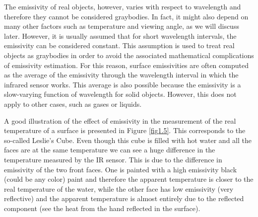 		\bigskip
		The emissivity of real objects, however, varies with respect to wavelength and therefore they cannot be considered graybodies. In fact, it might also depend on many other factors such as temperature and viewing angle, as we will discuss later. However, it is usually assumed that for short wavelength intervals, the emissivity can be considered constant. This assumption is used to treat real objects as graybodies in order to avoid the associated mathematical complications of emissivity estimation. For this reason, surface emissivities are often computed as the average of the emissivity through the wavelength interval in which the infrared sensor works. This average is also possible because the emissivity is a slow-varying function of wavelength for solid objects. However, this does not apply to other cases, such as gases or liquids.
		
		A good illustration of the effect of emissivity in the measurement of the real temperature of a surface is presented in Figure \ref{fig1.5}. This corresponds to the so-called Leslie’s Cube. Even though this cube is filled with hot water and all the faces are at the same temperature we can see a huge difference in the temperature measured by the IR sensor. This is due to the difference in emissivity of the two front faces. One is painted with a high emissivity black (could be any color) paint and therefore the apparent temperature is closer to the real temperature of the water, while the other face has low emissivity (very reflective) and the apparent temperature is almost entirely due to the reflected component (see the heat from the hand reflected in the surface).
		
